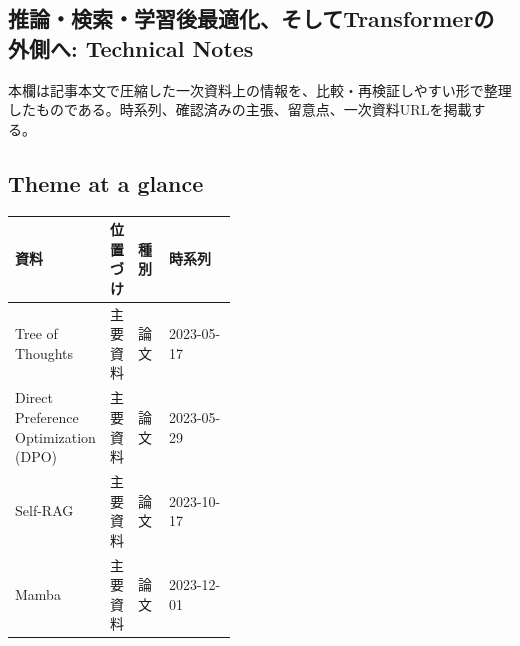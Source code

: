 \subsection*{推論・検索・学習後最適化、そしてTransformerの外側へ: Technical Notes}
本欄は記事本文で圧縮した一次資料上の情報を、比較・再検証しやすい形で整理したものである。時系列、確認済みの主張、留意点、一次資料URLを掲載する。
\smallskip
{}\par
\medskip
\subsection*{Theme at a glance}
\begin{center}
\footnotesize
\begin{tabularx}{\linewidth}{@{}p{0.20\linewidth}p{0.10\linewidth}p{0.14\linewidth}X@{}}
\toprule
資料 & 位置づけ & 種別 & 時系列 \\
\midrule
Tree of Thoughts & 主要資料 & 論文 & 2023-05-17 \\
Direct Preference Optimization (DPO) & 主要資料 & 論文 & 2023-05-29 \\
Self-RAG & 主要資料 & 論文 & 2023-10-17 \\
Mamba & 主要資料 & 論文 & 2023-12-01 \\
\bottomrule
\end{tabularx}
\end{center}
\normalsize

